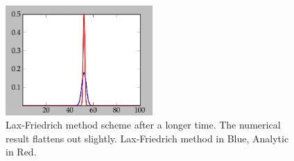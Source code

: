 \documentclass[11pt,letterpaper]{article}
\begin{document}
\begin{figure}[bth]
\centering
\includegraphics[width=0.5\textwidth]{LFM2.png}
\caption{Lax-Friedrich method scheme after a longer time. The numerical result flattens out slightly. Lax-Friedrich method in Blue, Analytic in Red.}
\label{fig:LFM2}
\end{figure}
\end{document}

